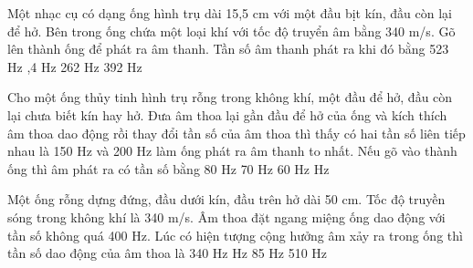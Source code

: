 \begin{ex}%
Một nhạc cụ có dạng ống hình trụ dài 15,5 cm với một đầu bịt kín, đầu còn lại để hở. Bên trong ống chứa một loại khí với tốc độ truyển âm bằng 340 m/s. Gõ lên thành ống để phát ra âm thanh. Tần số âm thanh phát ra khi đó bằng
\choice
{523 Hz}
{,4 Hz}
{262 Hz}
{392 Hz}
\end{ex} 
\begin{ex}%
Cho một ống thủy tinh hình trụ rỗng trong không khí, một đầu để hở, đầu còn lại chưa biết kín hay hở. Đưa âm thoa lại gần đầu để hở của ống và kích thích âm thoa dao động rồi thay đổi tần số của âm thoa thì thấy có hai tần số liên tiếp nhau là 150 Hz và 200 Hz làm ống phát ra âm thanh to nhất. Nếu gõ vào thành ống thì âm phát ra có tần số bằng
\choice
{80 Hz}
{70 Hz}
{60 Hz}
{ Hz}
\end{ex} 
\begin{ex}%
Một ống rỗng dựng đứng, đầu dưới kín, đầu trên hở dài 50 cm. Tốc độ truyền sóng trong không khí là 340 m/s. Âm thoa đặt ngang miệng ống dao động với tần số không quá 400 Hz. Lúc có hiện tượng cộng hưởng âm xảy ra trong ống thì tần số dao động của âm thoa là
\choice
{340 Hz}
{ Hz}
{85 Hz}
{510 Hz}
\end{ex} 
